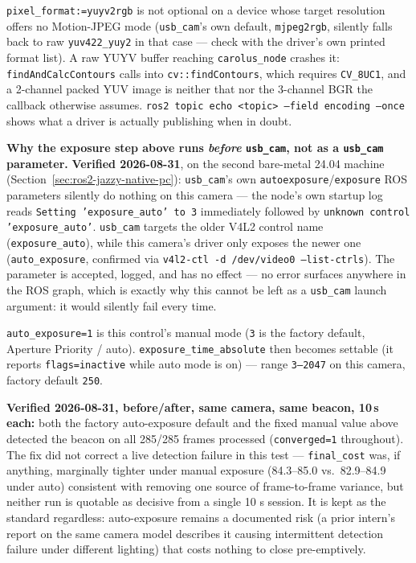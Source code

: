 \documentclass[11pt]{report}
\newenvironment{warningbox}%
  {\begin{lrbox}{\warnbox}\begin{minipage}{0.90\textwidth}}%
  {\end{minipage}\end{lrbox}%
   \begin{center}\fcolorbox{black}{codebg}{\usebox{\warnbox}}\end{center}}
\begin{document}
\begin{warningbox}
\texttt{pixel\_format:=yuyv2rgb} is not optional on a device whose target
resolution offers no Motion-JPEG mode (\texttt{usb\_cam}'s own default,
\texttt{mjpeg2rgb}, silently falls back to raw \texttt{yuv422\_yuy2} in that
case --- check with the driver's own printed format list). A raw YUYV
buffer reaching \texttt{carolus\_node} crashes it: \texttt{findAndCalcContours}
calls into \texttt{cv::findContours}, which requires \texttt{CV\_8UC1}, and a
2-channel packed YUV image is neither that nor the 3-channel BGR the
callback otherwise assumes. \texttt{ros2 topic echo <topic> --field encoding
--once} shows what a driver is actually publishing when in doubt.
\end{warningbox}

\begin{warningbox}
\textbf{Why the exposure step above runs \emph{before} \texttt{usb\_cam},
not as a \texttt{usb\_cam} parameter.} \textbf{Verified 2026-08-31}, on the
second bare-metal 24.04 machine (Section~\ref{sec:ros2-jazzy-native-pc}):
\texttt{usb\_cam}'s own \texttt{autoexposure}/\texttt{exposure} ROS
parameters silently do nothing on this camera --- the node's own startup log
reads \texttt{Setting 'exposure\_auto' to 3} immediately followed by
\texttt{unknown control 'exposure\_auto'}. \texttt{usb\_cam} targets the
older V4L2 control name (\texttt{exposure\_auto}), while this camera's
driver only exposes the newer one (\texttt{auto\_exposure}, confirmed via
\texttt{v4l2-ctl -d /dev/video0 --list-ctrls}). The parameter is accepted,
logged, and has no effect --- no error surfaces anywhere in the ROS graph,
which is exactly why this cannot be left as a \texttt{usb\_cam} launch
argument: it would silently fail every time.

\texttt{auto\_exposure=1} is this control's manual mode (\texttt{3} is the
factory default, Aperture Priority / auto).
\texttt{exposure\_time\_absolute} then becomes settable (it reports
\texttt{flags=inactive} while auto mode is on) --- range \texttt{3--2047} on
this camera, factory default \texttt{250}.

\textbf{Verified 2026-08-31, before/after, same camera, same beacon, 10\,s
each:} both the factory auto-exposure default and the fixed manual value
above detected the beacon on all 285/285 frames processed
(\texttt{converged=1} throughout). The fix did not correct a live detection
failure in this test --- \texttt{final\_cost} was, if anything, marginally
tighter under manual exposure (84.3--85.0 vs.\ 82.9--84.9 under auto)
consistent with removing one source of frame-to-frame variance, but neither
run is quotable as decisive from a single 10 s session. It is kept as the
standard regardless: auto-exposure remains a documented risk (a prior
intern's report on the same camera model describes it causing intermittent
detection failure under different lighting) that costs nothing to close
pre-emptively.
\end{warningbox}
\end{document}
